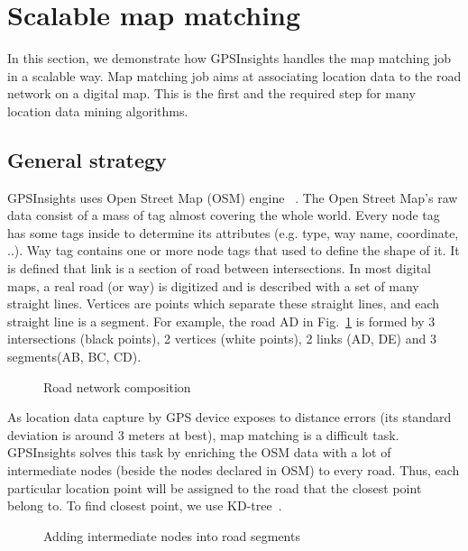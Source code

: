 \documentclass{acm_proc_article-sp}
\begin{document}
\section{Scalable map matching}

In this section, we demonstrate how GPSInsights handles the map matching job in a scalable way. Map matching job aims at associating location data to the road network on a digital map. This is the first and the required step for many location data mining algorithms. 
	
\subsection{General strategy} \label{ssec:links}

GPSInsights uses Open Street Map (OSM) engine ~\cite{openstreetmap}. The Open Street Map's raw data consist of a mass of tag almost covering the whole world. Every node tag has some tags inside to determine its attributes (e.g. type, way name, coordinate, ..). Way tag contains one or more node tags that used to define the shape of it. It is defined that link is a section of road between intersections. In most digital maps, a real road (or way) is digitized and is described with a set of many straight lines. Vertices are points which separate these straight lines, and each straight line is a segment. For example, the road AD in Fig.~\ref{fig:composition} is formed by 3 intersections (black points), 2 vertices (white points), 2 links (AD, DE) and 3 segments(AB, BC, CD).
		
\begin{figure}[h]
\centering
{}
\caption{Road network composition}
\label{fig:composition}
\end{figure}
	
As location data capture by GPS device exposes to distance errors (its standard deviation is around 3 meters at best), map matching is a difficult task. GPSInsights solves this task by enriching the OSM data with a lot of intermediate nodes (beside the nodes declared in OSM) to every road. Thus, each particular location point will be assigned to the road that the closest point belong to. To find closest point, we use KD-tree~\cite{moh2013approximate}. 

	
\begin{figure}[h]
\centering
{}
\caption{Adding intermediate nodes into road segments}
\label{fig:addPointsToRoad}
\end{figure}
	
\end{document}
